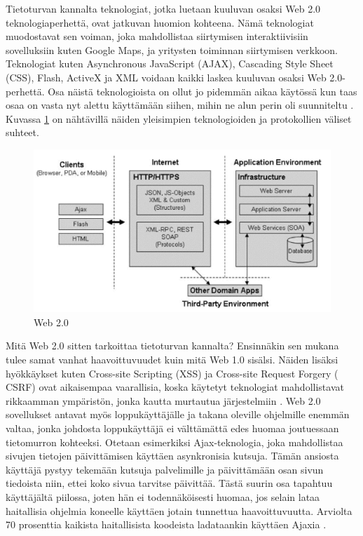 Tietoturvan kannalta teknologiat, jotka luetaan kuuluvan osaksi Web 2.0
teknologiaperhettä, ovat jatkuvan huomion kohteena. Nämä teknologiat
muodostavat sen voiman, joka mahdollistaa siirtymisen interaktiivisiin
sovelluksiin kuten Google Maps, ja yritysten toiminnan siirtymisen verkkoon.
Teknologiat kuten Asynchronous JavaScript (AJAX), Cascading Style Sheet (CSS),
Flash, ActiveX ja XML voidaan kaikki laskea kuuluvan osaksi Web 2.0-perhettä.
Osa näistä teknologioista on ollut jo pidemmän aikaa käytössä kun taas osaa on
vasta nyt alettu käyttämään siihen, mihin ne alun perin oli suunniteltu \cite{WEB2}.
Kuvassa \ref{web} on nähtävillä näiden yleisimpien teknologioiden ja protokollien
väliset suhteet.

\begin{figure}[htp]
\centering
\includegraphics[width=12cm]{pics/web.pdf}
\caption{Web 2.0}
\label{web}
\end{figure}

Mitä Web 2.0 sitten tarkoittaa tietoturvan kannalta? Ensinnäkin sen mukana
tulee samat vanhat haavoittuvuudet kuin mitä Web 1.0 sisälsi. Näiden lisäksi
hyökkäykset kuten Cross-site Scripting (XSS) ja Cross-site Request Forgery (
CSRF) ovat aikaisempaa vaarallisia, koska käytetyt teknologiat mahdollistavat
rikkaamman ympäristön, jonka kautta murtautua järjestelmiin \cite{WEB2}. Web 2.0
sovellukset antavat myös loppukäyttäjälle ja takana oleville ohjelmille enemmän
valtaa, jonka johdosta loppukäyttäjä ei välttämättä edes huomaa joutuessaan
tietomurron kohteeksi. Otetaan esimerkiksi Ajax-teknologia, joka mahdollistaa
sivujen tietojen päivittämisen käyttäen asynkronisia kutsuja. Tämän ansiosta
käyttäjä pystyy tekemään kutsuja palvelimille ja päivittämään osan sivun
tiedoista niin, ettei koko sivua tarvitse päivittää. Tästä suurin osa tapahtuu
käyttäjältä piilossa, joten hän ei todennäköisesti huomaa, jos selain lataa
haitallisia ohjelmia koneelle käyttäen jotain tunnettua haavoittuvuutta.
Arviolta 70 prosenttia kaikista haitallisista koodeista ladataankin käyttäen
Ajaxia \cite{WEB2c}.

